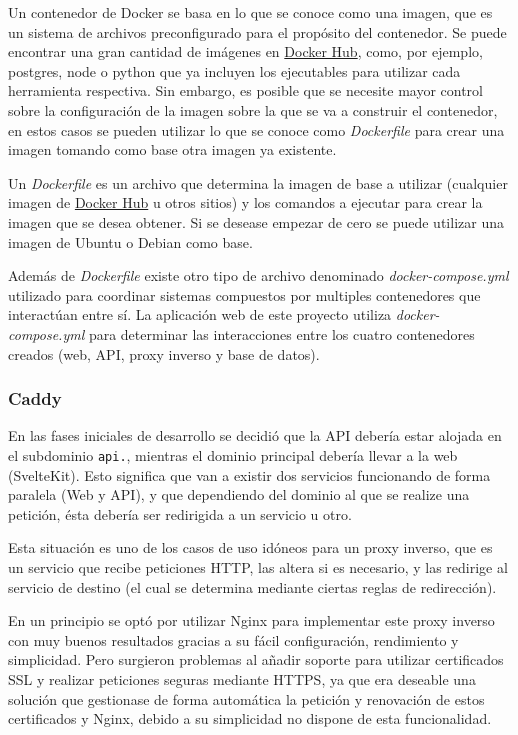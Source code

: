 Un contenedor de Docker se basa en lo que se conoce como una imagen, que es un
sistema de archivos preconfigurado para el propósito del contenedor. Se puede
encontrar una gran cantidad de imágenes en \href{https://hub.docker.com/}{Docker
Hub}, como, por ejemplo, postgres, node o python que ya incluyen los ejecutables
para utilizar cada herramienta respectiva. Sin embargo, es posible que se
necesite mayor control sobre la configuración de la imagen sobre la que se va a
construir el contenedor, en estos casos se pueden utilizar lo que se conoce como
\textit{Dockerfile} para crear una imagen tomando como base otra imagen ya
existente.

Un \textit{Dockerfile} es un archivo que determina la imagen de base a utilizar
(cualquier imagen de \href{https://hub.docker.com/}{Docker Hub} u otros sitios)
y los comandos a ejecutar para crear la imagen que se desea obtener. Si se
desease empezar de cero se puede utilizar una imagen de Ubuntu o Debian como
base.

Además de \textit{Dockerfile} existe otro tipo de archivo denominado
\textit{docker-compose.yml} utilizado para coordinar sistemas compuestos por
multiples contenedores que interactúan entre sí. La aplicación web de este
proyecto utiliza \textit{docker-compose.yml} para determinar las interacciones
entre los cuatro contenedores creados (web, API, proxy inverso y base de
datos).

\subsubsection{Caddy}

En las fases iniciales de desarrollo se decidió que la API debería estar alojada
en el subdominio \texttt{api.}, mientras el dominio principal debería llevar a
la web (SvelteKit). Esto significa que van a existir dos servicios funcionando
de forma paralela (Web y API), y que dependiendo del dominio al que se realize
una petición, ésta debería ser redirigida a un servicio u otro.

Esta situación es uno de los casos de uso idóneos para un proxy inverso, que es
un servicio que recibe peticiones HTTP, las altera si es necesario, y las
redirige al servicio de destino (el cual se determina mediante ciertas reglas de
redirección).

En un principio se optó por utilizar Nginx para implementar este proxy inverso
con muy buenos resultados gracias a su fácil configuración, rendimiento y
simplicidad. Pero surgieron problemas al añadir soporte para utilizar
certificados SSL y realizar peticiones seguras mediante HTTPS, ya que era
deseable una solución que gestionase de forma automática la petición y
renovación de estos certificados y Nginx, debido a su simplicidad no dispone de
esta funcionalidad.

